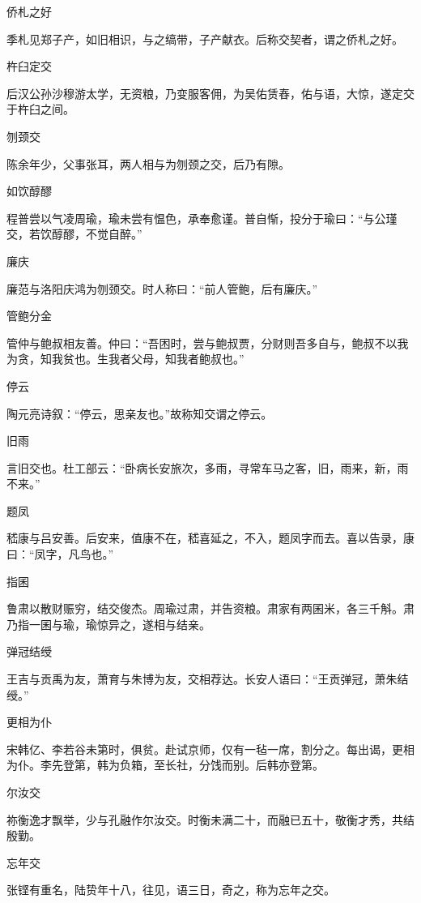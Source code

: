 \documentclass[a4paper,12pt,UTF8,twoside]{ctexbook}
\begin{document}
    侨札之好
    
    季札见郑子产，如旧相识，与之缟带，子产献衣。后称交契者，谓之侨札之好。
    
    杵臼定交
    
    后汉公孙沙穆游太学，无资粮，乃变服客佣，为吴佑赁舂，佑与语，大惊，遂定交于杵臼之间。
    
    刎颈交
    
    陈余年少，父事张耳，两人相与为刎颈之交，后乃有隙。
    
    如饮醇醪
    
    程普尝以气凌周瑜，瑜未尝有愠色，承奉愈谨。普自惭，投分于瑜曰：“与公瑾交，若饮醇醪，不觉自醉。”
    
    廉庆
    
    廉范与洛阳庆鸿为刎颈交。时人称曰：“前人管鲍，后有廉庆。”
    
    管鲍分金
    
    管仲与鲍叔相友善。仲曰：“吾困时，尝与鲍叔贾，分财则吾多自与，鲍叔不以我为贪，知我贫也。生我者父母，知我者鲍叔也。”
    
    停云
    
    陶元亮诗叙：“停云，思亲友也。”故称知交谓之停云。
    
    旧雨
    
    言旧交也。杜工部云：“卧病长安旅次，多雨，寻常车马之客，旧，雨来，新，雨不来。”
    
    题凤
    
    嵇康与吕安善。后安来，值康不在，嵇喜延之，不入，题凤字而去。喜以告录，康曰：“凤字，凡鸟也。”
    
    指囷
    
    鲁肃以散财赈穷，结交俊杰。周瑜过肃，并告资粮。肃家有两囷米，各三千斛。肃乃指一囷与瑜，瑜惊异之，遂相与结亲。
    
    弹冠结绶
    
    王吉与贡禹为友，萧育与朱博为友，交相荐达。长安人语曰：“王贡弹冠，萧朱结绶。”
    
    更相为仆
    
    宋韩亿、李若谷未第时，俱贫。赴试京师，仅有一毡一席，割分之。每出谒，更相为仆。李先登第，韩为负箱，至长社，分饯而别。后韩亦登第。
    
    尔汝交
    
    祢衡逸才飘举，少与孔融作尔汝交。时衡未满二十，而融已五十，敬衡才秀，共结殷勤。
    
    忘年交
    
    张铿有重名，陆贽年十八，往见，语三日，奇之，称为忘年之交。
    
\end{document}
